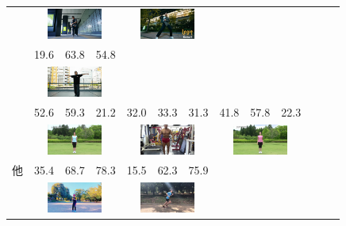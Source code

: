 \begin{table}[t]
\begin{center}
\begin{tabular}{|c|p{5mm}p{5mm}p{5mm}|p{5mm}p{5mm}p{5mm}|p{5mm}p{5mm}p{5mm}|p{5mm}p{5mm}p{5mm}|}
        & \multicolumn{3}{|c|}{\includegraphics[width=18mm]{images/snaps/hyoga_dance.png}}
        & \multicolumn{3}{|c|}{\includegraphics[width=18mm]{images/snaps/legit_dance.png}}
      \\ \cline{2-13}
        &19.6 &63.8 &54.8 & & & & & & & & & \\
        & \multicolumn{3}{|c|}{\includegraphics[width=18mm]{images/snaps/aito_dance.png}}
        & \multicolumn{3}{|c|}{}
        & \multicolumn{3}{|c|}{}
        & \multicolumn{3}{|c|}{}
      \\ \hline
        &52.6 &59.3 &21.2 &32.0 &33.3 &31.3 &41.8 &57.8 &22.3 & & & \\
        & \multicolumn{3}{|c|}{\includegraphics[width=18mm]{images/snaps/radio_exer.png}}
        & \multicolumn{3}{|c|}{\includegraphics[width=18mm]{images/snaps/posing.png}}
        & \multicolumn{3}{|c|}{\includegraphics[width=18mm]{images/snaps/radio_exer_2.png}}
        & \multicolumn{3}{|c|}{}
      \\ \cline{2-13}
      他
        &35.4 &68.7 &78.3 &15.5 &62.3 &75.9 & & & & & & \\
        & \multicolumn{3}{|c|}{\includegraphics[width=18mm]{images/snaps/shadowboxing.png}}
        & \multicolumn{3}{|c|}{\includegraphics[width=18mm]{images/snaps/running.png}}

\end{tabular}
\end{center}
\end{table}
